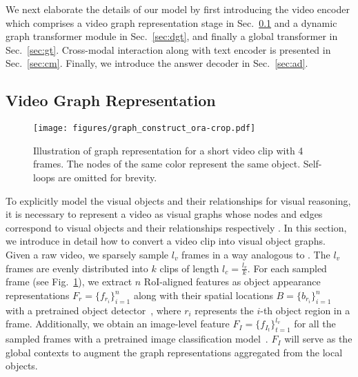 \documentclass[10pt,journal,compsoc]{IEEEtran}
\begin{document}
We next elaborate the details of our model by first introducing the video encoder which comprises a video graph representation stage in Sec.~\ref{sec:vgr} and a dynamic graph transformer module in Sec.~\ref{sec:dgt}, and finally a global transformer in Sec.~\ref{sec:gt}. Cross-modal interaction along with text encoder is presented in Sec.~\ref{sec:cm}. Finally, we introduce the answer decoder in Sec.~\ref{sec:ad}. 

\subsection{Video Graph Representation}
\label{sec:vgr}
\begin{figure}[t]
  \begin{center}
    \texttt{[image: figures/graph\_construct\_ora-crop.pdf]}
  \end{center}
  \vspace{-0.3cm}
  \caption{Illustration of graph representation for a short video clip with 4 frames. The nodes of the same color represent the same object. Self-loops are omitted for brevity.}
\vspace{-0.4cm}
  \label{fig:vgr}
\end{figure}

To explicitly model the visual objects and their relationships for visual reasoning, it is necessary to represent a video as visual graphs whose nodes and edges correspond to visual objects and their relationships respectively \cite{tsai2019video,xiao2021video}.
In this section, we introduce in detail how to convert a video clip into visual object graphs. Given a raw video, we sparsely sample $l_v$ frames in a way analogous to \cite{xiao2021video}. The $l_v$ frames are evenly distributed into $k$ clips of length $l_c=\frac{l_v}{k}$.
For each sampled frame (see Fig.~\ref{fig:vgr}), we extract $n$ RoI-aligned features as object appearance representations $F_r\!=\!\{f_{r_i}\}_{i=1}^n$ along with their spatial locations $B\!=\!\{b_{r_i}\}_{i=1}^n$ with a pretrained object detector~\cite{anderson2018bottom,ren2015faster}, where $r_i$ represents the $i$-th object region in a frame. Additionally, we obtain an image-level feature $F_I\!=\!\{f_{I_t}\}_{t=1}^{l_v}$ for all the sampled frames with a pretrained image classification model~\cite{he2016deep}. $F_I$ will serve as the global contexts to augment the graph representations aggregated from the local objects. 
\end{document}
